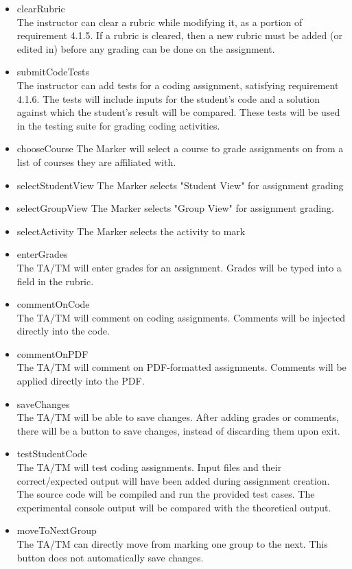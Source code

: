 \documentclass{article}
\begin{document}
\begin{itemize}
\item clearRubric \hfill \\
The instructor can clear a rubric while modifying it, as a portion of requirement 4.1.5. If a rubric is cleared, then a new rubric must be added (or edited in) before any grading can be done on the assignment.
\item submitCodeTests \hfill \\
The instructor can add tests for a coding assignment, satisfying requirement 4.1.6. The tests will include inputs for the student's code and a solution against which the student's result will be compared. These tests will be used in the testing suite for grading coding activities.

  \item chooseCourse
The Marker will select a course to grade assignments on from a list of courses they are affiliated with.
  \item selectStudentView
The Marker selects "Student View" for assignment grading
  \item selectGroupView
The Marker selects "Group View" for assignment grading.
  \item selectActivity
The Marker selects the activity to mark
\item enterGrades \hfill \\
The TA/TM will enter grades for an assignment.  Grades will be typed into a field in the rubric.
\item commentOnCode \hfill \\
The TA/TM will comment on coding assignments.  Comments will be injected directly into the code.
\item commentOnPDF \hfill \\
The TA/TM will comment on PDF-formatted assignments.  Comments will be applied directly into the PDF.
\item saveChanges \hfill \\
The TA/TM will be able to save changes.  After adding grades or comments, there will be a button to save changes, instead of discarding them upon exit.
\item testStudentCode \hfill \\
The TA/TM will test coding assignments.  Input files and their correct/expected output will have been added during assignment creation.  The source code will be compiled and run the provided test cases.  The experimental console output will be compared with the theoretical output.
\item moveToNextGroup \hfill \\
The TA/TM can directly move from marking one group to the next.  This button does not automatically save changes.
\end{itemize}
\end{document}
